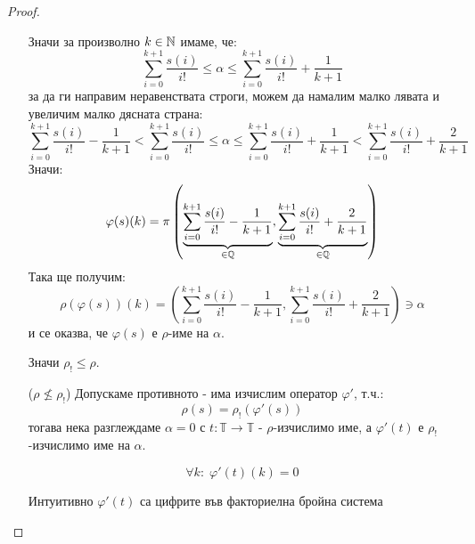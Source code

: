\begin{proof}
\begin{itemize}
              Значи за произволно $k \in {\mathbb{N}}$ имаме, че:
              \begin{equation}
                  \sum\limits_{i=0}^{k+1} \frac{s(i)}{i!} \leq \alpha \leq \sum\limits_{i=0}^{k+1} \frac{s(i)}{i!} + \frac{1}{k+1}
              \end{equation}
              за да ги направим неравенствата строги, можем да намалим малко лявата и увеличим малко дясната страна:
              \begin{equation}
                  \sum\limits_{i=0}^{k+1} \frac{s(i)}{i!} - \frac{1}{k+1} < \sum\limits_{i=0}^{k+1} \frac{s(i)}{i!} \leq \alpha \leq \sum\limits_{i=0}^{k+1} \frac{s(i)}{i!} + \frac{1}{k+1} < \sum\limits_{i=0}^{k+1} \frac{s(i)}{i!} + \frac{2}{k+1}
              \end{equation}
              Значи:
              \begin{equation}
                  \varphi(s)(k) = \pi\left(\underbrace{\sum\limits_{i=0}^{k+1} \frac{s(i)}{i!} - \frac{1}{k+1}}_{\in {\mathbb{Q}}}, \underbrace{\sum\limits_{i=0}^{k+1} \frac{s(i)}{i!} + \frac{2}{k+1}}_{\in{\mathbb{Q}}}\right)
              \end{equation}
              Така ще получим:
              \begin{equation}
                  \rho(\varphi(s))(k) = \left(\sum\limits_{i=0}^{k+1} \frac{s(i)}{i!} - \frac{1}{k+1}, \sum\limits_{i=0}^{k+1} \frac{s(i)}{i!} + \frac{2}{k+1}\right) \ni \alpha
              \end{equation}
              и се оказва, че $\varphi(s)$ е $\rho$-име на $\alpha$.

              Значи $\rho_! \leq \rho$.

        \item[($\rho \nleq \rho_!$)] Допускаме противното - има изчислим оператор $\varphi'$, т.ч.:
              \begin{equation}
                  \rho(s) = \rho_!(\varphi'(s))
              \end{equation}
              тогава нека разглеждаме $\alpha = 0$ с $t: \mathbb T \to \mathbb T$ - $\rho$-изчислимо име, а $\varphi'(t)$ е $\rho_!$-изчислимо име на $\alpha$.

              \begin{equation}
                  \forall k:\; \varphi'(t)(k) = 0
              \end{equation}

              Интуитивно $\varphi'(t)$ са цифрите във факториелна бройна система


\end{itemize}
\end{proof}
